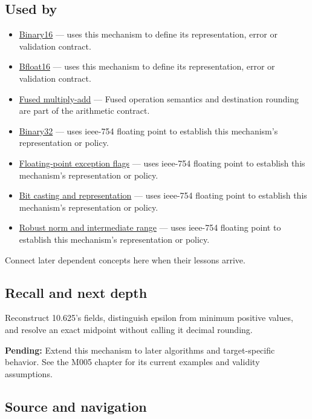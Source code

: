 \subsection{Used by}\label{used-by}

\begin{itemize}
\item
  \hyperref[appendix-34443cec7170]{Binary16} --- uses this mechanism to define its representation, error or validation contract.
\item
  \hyperref[appendix-18b8dd966b5d]{Bfloat16} --- uses this mechanism to define its representation, error or validation contract.
\item
  \hyperref[appendix-41e8ef22a21e]{Fused multiply-add} --- Fused operation semantics and destination rounding are part of the arithmetic contract.
\item
  \hyperref[appendix-5057f9ad327f]{Binary32} --- uses ieee-754 floating point to establish this mechanism's representation or policy.
\item
  \hyperref[appendix-ed8531b46754]{Floating-point exception flags} --- uses ieee-754 floating point to establish this mechanism's representation or policy.
\item
  \hyperref[appendix-34ee45f161c1]{Bit casting and representation} --- uses ieee-754 floating point to establish this mechanism's representation or policy.
\item
  \hyperref[appendix-7f1e17dcafb1]{Robust norm and intermediate range} --- uses ieee-754 floating point to establish this mechanism's representation or policy.
\end{itemize}

Connect later dependent concepts here when their lessons arrive.

\subsection{Recall and next depth}\label{recall-and-next-depth}

Reconstruct 10.625's fields, distinguish epsilon from minimum positive values, and resolve an exact midpoint without calling it decimal rounding.

\textbf{Pending:} Extend this mechanism to later algorithms and target-specific behavior. See the M005 chapter for its current examples and validity assumptions.

\subsection{Source and navigation}\label{source-and-navigation}

